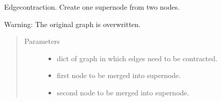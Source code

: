 \documentclass[letterpaper,10pt,english]{sphinxmanual}
\begin{document}
\begin{fulllineitems}
\label{\detokenize{clustering:clustering.contractEdge}}
\sphinxAtStartPar
Edgecontraction. Create one supernode from two nodes.

\sphinxAtStartPar
Warning: The original graph is overwritten.
\begin{quote}\begin{description}
\item[{Parameters}] \leavevmode\begin{itemize}
\item {} 
\sphinxAtStartPar
{} \textendash{} dict of graph in which edges need to be contracted.

\item {} 
\sphinxAtStartPar
{} \textendash{} first node to be merged into supernode.

\item {} 
\sphinxAtStartPar
{} \textendash{} second node to be merged into supernode.

\end{itemize}

\end{description}\end{quote}

\end{fulllineitems}

\end{document}
